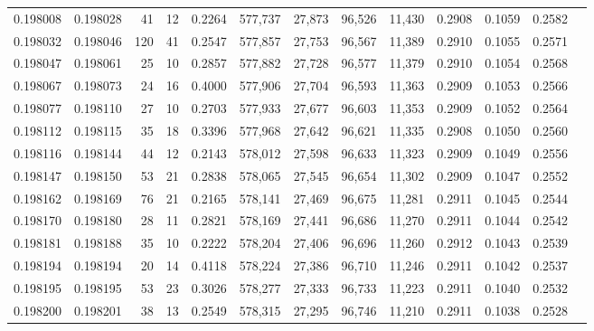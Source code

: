 \begin{tabular}{rrrrrrrrrrrrr}
0.198008 & 0.198028 &    41 &  12 &                                     0.2264 & 577,737 &  27,873 &  96,526 &  11,430 & 0.2908 & 0.1059 & 0.2582 \\
0.198032 & 0.198046 &   120 &  41 &                                     0.2547 & 577,857 &  27,753 &  96,567 &  11,389 & 0.2910 & 0.1055 & 0.2571 \\
0.198047 & 0.198061 &    25 &  10 &                                     0.2857 & 577,882 &  27,728 &  96,577 &  11,379 & 0.2910 & 0.1054 & 0.2568 \\
0.198067 & 0.198073 &    24 &  16 &                                     0.4000 & 577,906 &  27,704 &  96,593 &  11,363 & 0.2909 & 0.1053 & 0.2566 \\
0.198077 & 0.198110 &    27 &  10 &                                     0.2703 & 577,933 &  27,677 &  96,603 &  11,353 & 0.2909 & 0.1052 & 0.2564 \\
0.198112 & 0.198115 &    35 &  18 &                                     0.3396 & 577,968 &  27,642 &  96,621 &  11,335 & 0.2908 & 0.1050 & 0.2560 \\
0.198116 & 0.198144 &    44 &  12 &                                     0.2143 & 578,012 &  27,598 &  96,633 &  11,323 & 0.2909 & 0.1049 & 0.2556 \\
0.198147 & 0.198150 &    53 &  21 &                                     0.2838 & 578,065 &  27,545 &  96,654 &  11,302 & 0.2909 & 0.1047 & 0.2552 \\
0.198162 & 0.198169 &    76 &  21 &                                     0.2165 & 578,141 &  27,469 &  96,675 &  11,281 & 0.2911 & 0.1045 & 0.2544 \\
0.198170 & 0.198180 &    28 &  11 &                                     0.2821 & 578,169 &  27,441 &  96,686 &  11,270 & 0.2911 & 0.1044 & 0.2542 \\
0.198181 & 0.198188 &    35 &  10 &                                     0.2222 & 578,204 &  27,406 &  96,696 &  11,260 & 0.2912 & 0.1043 & 0.2539 \\
0.198194 & 0.198194 &    20 &  14 &                                     0.4118 & 578,224 &  27,386 &  96,710 &  11,246 & 0.2911 & 0.1042 & 0.2537 \\
0.198195 & 0.198195 &    53 &  23 &                                     0.3026 & 578,277 &  27,333 &  96,733 &  11,223 & 0.2911 & 0.1040 & 0.2532 \\
0.198200 & 0.198201 &    38 &  13 &                                     0.2549 & 578,315 &  27,295 &  96,746 &  11,210 & 0.2911 & 0.1038 & 0.2528 \\

\end{tabular}
